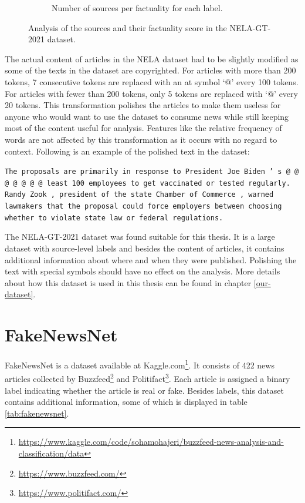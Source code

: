 \begin{figure}[H]
\begin{subfigure}{.5\textwidth}
      \caption{Number of sources per factuality for each label.}
      \label{fig:factuality_by_src}
    \end{subfigure}
    \caption{Analysis of the sources and their factuality score in the NELA-GT-2021 dataset.}
    \label{fig:test3}
\end{figure}

The actual content of articles in the NELA dataset had to be slightly modified as some of the texts in the dataset are copyrighted. For articles with more than 200 tokens, 7 consecutive tokens are replaced with an at symbol ‘@’ every 100 tokens. For articles with fewer than 200 tokens, only 5 tokens are replaced with ‘@’ every 20 tokens. This transformation polishes the articles to make them useless for anyone who would want to use the dataset to consume news while still keeping most of the content useful for analysis. Features like the relative frequency of words are not affected by this transformation as it occurs with no regard to context. Following is an example of the polished text in the dataset:

\begin{center}
    \texttt{The proposals are primarily in response to President Joe Biden ’ s @ @ @ @ @ @ @ least 100 employees to get vaccinated or tested regularly. Randy Zook , president of the state Chamber of Commerce , warned lawmakers that the proposal could force employers between choosing whether to violate state law or federal regulations.}
\end{center}

The NELA-GT-2021 dataset was found suitable for this thesis. It is a large dataset with source-level labels and besides the content of articles, it contains additional information about where and when they were published. Polishing the text with special symbols should have no effect on the analysis. More details about how this dataset is used in this thesis can be found in chapter \ref{our-dataset}.


\section{FakeNewsNet}
\label{fake_news_net}
FakeNewsNet is a dataset available at Kaggle.com\footnote{\url{https://www.kaggle.com/code/sohamohajeri/buzzfeed-news-analysis-and-classification/data}}. It consists of 422 news articles collected by Buzzfeed\footnote{\url{https://www.buzzfeed.com/}} and Politifact\footnote{\url{https://www.politifact.com/}}. Each article is assigned a binary label indicating whether the article is real or fake. Besides labels, this dataset contains additional information, some of which is displayed in table \ref{tab:fakenewsnet}.


